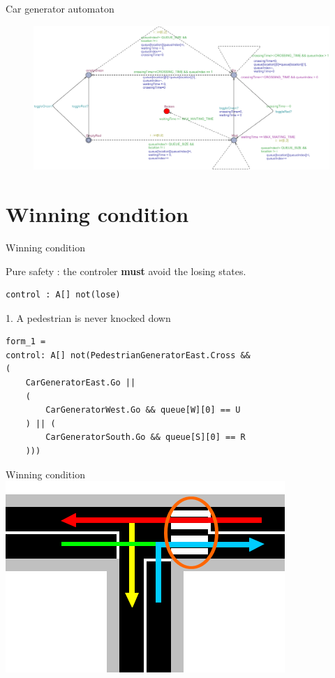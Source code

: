 \documentclass{bredelebeamer}
\begin{document}
\begin{frame}{Car generator automaton}
\begin{figure}[h]
\centering
\includegraphics[width=\textwidth]{images/cargeneratort.png}
\end{figure}
\end{frame}


\section{Winning condition}
\begin{frame}[fragile]{Winning condition}
\begin{alertblock}{}
Pure safety : the controler \textbf{must} avoid the losing states.
\begin{verbatim}
control : A[] not(lose)
\end{verbatim}
\end{alertblock}



\begin{block}{1. A pedestrian is never knocked down}
\begin{verbatim}
form_1 = 
control: A[] not(PedestrianGeneratorEast.Cross && 
(
    CarGeneratorEast.Go || 
    (
        CarGeneratorWest.Go && queue[W][0] == U
    ) || (
        CarGeneratorSouth.Go && queue[S][0] == R
    )))
\end{verbatim}
\end{block}

\end{frame}
\begin{frame}[fragile]{Winning condition}
\centering
\includegraphics[scale=0.8]{images/pietonCollision.png}

\end{frame}
\end{document}
